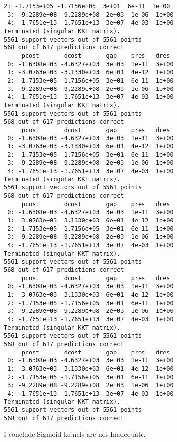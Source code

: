 \documentclass[11pt]{article}
\begin{document}
\begin{Verbatim}[commandchars=\\\{\}]
 2: -1.7153e+05 -1.7156e+05  3e+01  6e-11  1e+00
 3: -9.2289e+08 -9.2289e+08  2e+03  1e-06  1e+00
 4: -1.7651e+13 -1.7651e+13  3e+07  4e-03  1e+00
Terminated (singular KKT matrix).
5561 support vectors out of 5561 points
568 out of 617 predictions correct
     pcost       dcost       gap    pres   dres
 0: -1.6308e+03 -4.6327e+03  3e+03  1e-11  3e+00
 1: -3.0763e+03 -3.1330e+03  6e+01  4e-12  1e+00
 2: -1.7153e+05 -1.7156e+05  3e+01  6e-11  1e+00
 3: -9.2289e+08 -9.2289e+08  2e+03  1e-06  1e+00
 4: -1.7651e+13 -1.7651e+13  3e+07  4e-03  1e+00
Terminated (singular KKT matrix).
5561 support vectors out of 5561 points
568 out of 617 predictions correct
     pcost       dcost       gap    pres   dres
 0: -1.6308e+03 -4.6327e+03  3e+03  1e-11  3e+00
 1: -3.0763e+03 -3.1330e+03  6e+01  4e-12  1e+00
 2: -1.7153e+05 -1.7156e+05  3e+01  6e-11  1e+00
 3: -9.2289e+08 -9.2289e+08  2e+03  1e-06  1e+00
 4: -1.7651e+13 -1.7651e+13  3e+07  4e-03  1e+00
Terminated (singular KKT matrix).
5561 support vectors out of 5561 points
568 out of 617 predictions correct
     pcost       dcost       gap    pres   dres
 0: -1.6308e+03 -4.6327e+03  3e+03  1e-11  3e+00
 1: -3.0763e+03 -3.1330e+03  6e+01  4e-12  1e+00
 2: -1.7153e+05 -1.7156e+05  3e+01  6e-11  1e+00
 3: -9.2289e+08 -9.2289e+08  2e+03  1e-06  1e+00
 4: -1.7651e+13 -1.7651e+13  3e+07  4e-03  1e+00
Terminated (singular KKT matrix).
5561 support vectors out of 5561 points
568 out of 617 predictions correct
     pcost       dcost       gap    pres   dres
 0: -1.6308e+03 -4.6327e+03  3e+03  1e-11  3e+00
 1: -3.0763e+03 -3.1330e+03  6e+01  4e-12  1e+00
 2: -1.7153e+05 -1.7156e+05  3e+01  6e-11  1e+00
 3: -9.2289e+08 -9.2289e+08  2e+03  1e-06  1e+00
 4: -1.7651e+13 -1.7651e+13  3e+07  4e-03  1e+00
Terminated (singular KKT matrix).
5561 support vectors out of 5561 points
568 out of 617 predictions correct
     pcost       dcost       gap    pres   dres
 0: -1.6308e+03 -4.6327e+03  3e+03  1e-11  3e+00
 1: -3.0763e+03 -3.1330e+03  6e+01  4e-12  1e+00
 2: -1.7153e+05 -1.7156e+05  3e+01  6e-11  1e+00
 3: -9.2289e+08 -9.2289e+08  2e+03  1e-06  1e+00
 4: -1.7651e+13 -1.7651e+13  3e+07  4e-03  1e+00
Terminated (singular KKT matrix).
5561 support vectors out of 5561 points
568 out of 617 predictions correct

    \end{Verbatim}

    I conclude Sigmoid kernels are not Inadequate.


    
    
    
    
\end{document}
